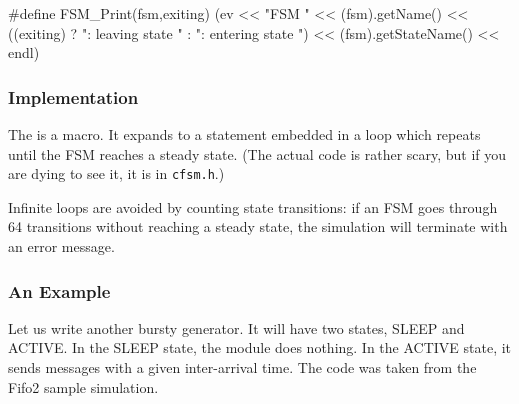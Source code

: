 \begin{cpp}
#define FSM_Print(fsm,exiting)
  (ev << "FSM " << (fsm).getName()
      << ((exiting) ? ": leaving state " : ": entering state ")
      << (fsm).getStateName() << endl)
\end{cpp}


\subsubsection{Implementation}


The  is a macro. It expands to a 
statement embedded in a  loop which repeats until the
FSM reaches a steady state. (The actual code is rather
scary, but if you are dying to see it, it is in \texttt{cfsm.h}.)

Infinite loops are avoided by counting state transitions: if
an FSM goes through 64 transitions without reaching a steady
state, the simulation will terminate with an error message.


\subsubsection{An Example}


Let us write another bursty generator. It will have two
states, SLEEP and ACTIVE. In the SLEEP state, the module does
nothing. In the ACTIVE state, it sends messages with a given
inter-arrival time. The code was taken from the Fifo2 sample
simulation.


